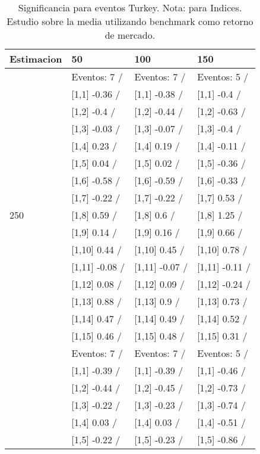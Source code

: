 \begin{table}

\caption{Significancia para eventos Turkey. Nota: para Indices. Estudio sobre la media utilizando benchmark como retorno de mercado.}
\centering
\begin{tabular}[t]{llll}
\toprule
Estimacion & 50 & 100 & 150\\
\midrule
 & Eventos:  7 / & Eventos:  7 / & Eventos:  5 /\\
 & {}[1,1] -0.36  / & {}[1,1] -0.38  / & {}[1,1] -0.4  /\\
 & {}[1,2] -0.4  / & {}[1,2] -0.44  / & {}[1,2] -0.63  /\\
 & {}[1,3] -0.03  / & {}[1,3] -0.07  / & {}[1,3] -0.4  /\\
 & {}[1,4] 0.23  / & {}[1,4] 0.19  / & {}[1,4] -0.11  /\\
\addlinespace
 & {}[1,5] 0.04  / & {}[1,5] 0.02  / & {}[1,5] -0.36  /\\
 & {}[1,6] -0.58  / & {}[1,6] -0.59  / & {}[1,6] -0.33  /\\
 & {}[1,7] -0.22  / & {}[1,7] -0.22  / & {}[1,7] 0.53  /\\
250 & {}[1,8] 0.59  / & {}[1,8] 0.6  / & {}[1,8] 1.25  /\\
 & {}[1,9] 0.14  / & {}[1,9] 0.16  / & {}[1,9] 0.66  /\\
\addlinespace
 & {}[1,10] 0.44  / & {}[1,10] 0.45  / & {}[1,10] 0.78  /\\
 & {}[1,11] -0.08  / & {}[1,11] -0.07  / & {}[1,11] -0.11  /\\
 & {}[1,12] 0.08  / & {}[1,12] 0.09  / & {}[1,12] -0.24  /\\
 & {}[1,13] 0.88  / & {}[1,13] 0.9  / & {}[1,13] 0.73  /\\
 & {}[1,14] 0.47  / & {}[1,14] 0.49  / & {}[1,14] 0.52  /\\
\addlinespace
 & {}[1,15] 0.46  / & {}[1,15] 0.48  / & {}[1,15] 0.31  /\\
 & Eventos:  7 / & Eventos:  7 / & Eventos:  5 /\\
 & {}[1,1] -0.39  / & {}[1,1] -0.39  / & {}[1,1] -0.46  /\\
 & {}[1,2] -0.44  / & {}[1,2] -0.45  / & {}[1,2] -0.73  /\\
 & {}[1,3] -0.22  / & {}[1,3] -0.23  / & {}[1,3] -0.74  /\\
\addlinespace
 & {}[1,4] 0.03  / & {}[1,4] 0.03  / & {}[1,4] -0.51  /\\
 & {}[1,5] -0.22  / & {}[1,5] -0.23  / & {}[1,5] -0.86  /\\

\end{tabular}
\end{table}
